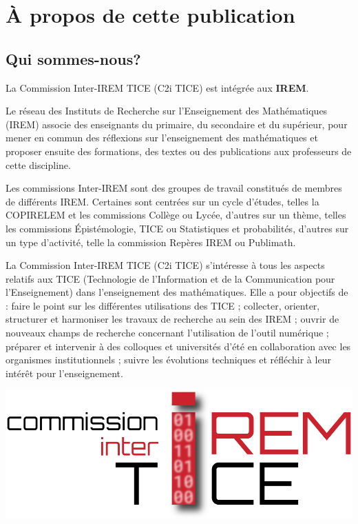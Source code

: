 \pagestyle{plain}

\section{À propos de cette publication}

\subsection{Qui sommes-nous?}

La Commission Inter-IREM TICE (C2i TICE) est intégrée aux \textbf{IREM}.

Le réseau des Instituts de Recherche sur l’Enseignement des Mathématiques (IREM) associe des enseignants du primaire, du secondaire et du supérieur, pour mener en commun des réflexions sur l’enseignement des mathématiques et proposer ensuite des formations, des textes ou des publications aux professeurs de cette discipline.

Les commissions Inter-IREM sont des groupes de travail constitués de membres de différents IREM. Certaines sont centrées sur un cycle d’études, telles la COPIRELEM et les commissions Collège ou Lycée, d’autres sur un thème, telles les commissions Épistémologie, TICE ou Statistiques et probabilités, d’autres sur un type d’activité, telle la commission Repères IREM ou Publimath.

La Commission Inter-IREM TICE (C2i TICE) s’intéresse à tous les aspects relatifs aux TICE (Technologie de l’Information et de la Communication pour l’Enseignement) dans l’enseignement des mathématiques.
Elle a pour objectifs de : faire le point sur les différentes utilisations des TICE ; collecter, orienter, structurer et harmoniser les travaux de recherche au sein des IREM ; ouvrir de nouveaux champs de recherche concernant l’utilisation de l’outil numérique ; préparer et intervenir à des colloques et universités d’été en collaboration avec les organismes institutionnels ; suivre les évolutions techniques et réfléchir à leur intérêt pour l’enseignement.

\begin{center}
    \includegraphics[width=0.5\linewidth]{res/fig-c2it}
\end{center}


